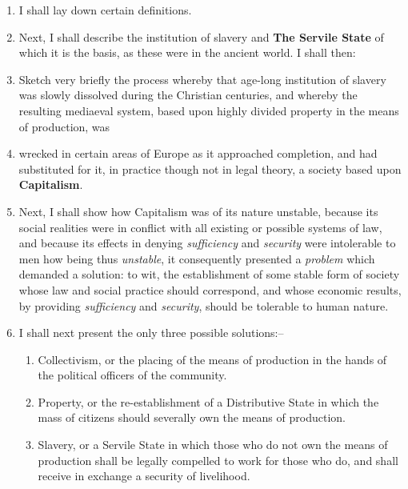 \documentclass{book}
\begin{document}
\begin{enumerate}
	\item I shall lay down certain definitions.

	\item Next, I shall describe the institution of slavery and \textbf{The Servile State} of which it is the basis, as these were in the ancient world. I shall then:

	\item Sketch very briefly the process whereby that age-long institution of slavery was slowly dissolved during the Christian centuries, and whereby the resulting mediaeval system, based upon highly divided property in the means of production, was

	\item wrecked in certain areas of Europe as it approached completion, and had substituted for it, in practice though not in legal theory, a society based upon \textbf{Capitalism}.

	\item Next, I shall show how Capitalism was of its nature unstable, because its social realities were in conflict with all existing or possible systems of law, and because its effects in denying \emph{sufficiency} and \emph{security} were intolerable to men how being thus \emph{unstable}, it consequently presented a \emph{problem} which demanded a solution: to wit, the establishment of some stable form of society whose law and social practice should correspond, and whose economic results, by providing \emph{sufficiency} and \emph{security}, should be tolerable to human nature.

	\item I shall next present the only three possible solutions:–

	      \begin{enumerate}
		      \item Collectivism, or the placing of the means of production in the hands of the political officers of the community.

		      \item Property, or the re-establishment of a Distributive State in which the mass of citizens should severally own the means of production.

		      \item Slavery, or a Servile State in which those who do not own the means of production shall be legally compelled to work for those who do, and shall receive in exchange a security of livelihood.


\end{enumerate}
\end{enumerate}
\end{document}
